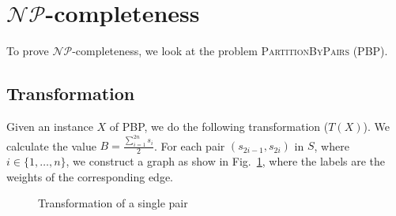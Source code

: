 \documentclass[11pt,a4paper]{article}
\author{Mikkel Riber Bojsen - s093255}
\begin{document}
\section{$\mathcal{NP}$-completeness}

To prove $\mathcal{NP}$-completeness, we look at the problem \textsc{PartitionByPairs} (PBP). 

\subsection{Transformation}
Given an instance $X$ of PBP, we do the following transformation ($T(X)$). We calculate the value $B = \frac{\sum_{i=1}^{2n} s_i}{2}$. For each pair $(s_{2i-1}, s_{2i})$ in $S$,  where $i \in \lbrace 1,\dots, n \rbrace $, we construct a graph as show in Fig.~\ref{fig:transform1}, where the labels are the weights of the corresponding edge. 

\begin{figure}[!htb]
\centering
{}
\caption{Transformation of a single pair}
\label{fig:transform1}
\end{figure}
\end{document}
